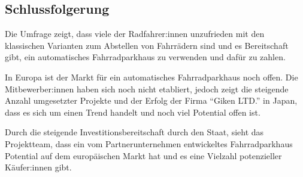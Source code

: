 \subsection{Schlussfolgerung}

Die Umfrage zeigt, dass viele der Radfahrer:innen unzufrieden mit den klassischen Varianten zum Abstellen von Fahrrädern sind und es Bereitschaft gibt, ein automatisches Fahrradparkhaus zu verwenden und dafür zu zahlen.

\smallskip \noindent In Europa ist der Markt für ein automatisches Fahrradparkhaus noch offen. Die Mitbewerber:innen haben sich noch nicht etabliert, jedoch zeigt die steigende Anzahl umgesetzter Projekte und der Erfolg der Firma \enquote{Giken LTD.} in Japan, dass es sich um einen Trend handelt und noch viel Potential offen ist.

\smallskip \noindent Durch die steigende Investitionsbereitschaft durch den Staat, sieht das Projektteam, dass ein vom Partnerunternehmen entwickeltes Fahrradparkhaus Potential auf dem europäischen Markt hat und es eine Vielzahl potenzieller Käufer:innen gibt.
